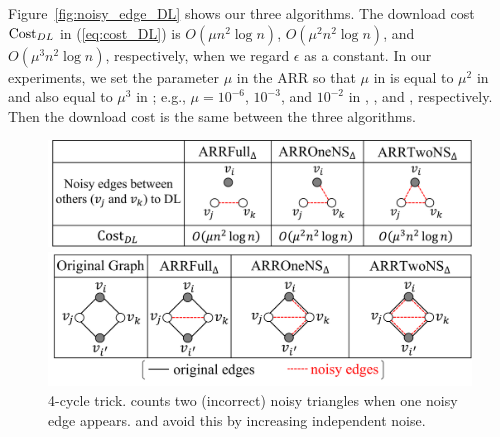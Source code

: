 Figure~\ref{fig:noisy_edge_DL} shows our three algorithms.
The download cost $\mathrm{Cost}_{DL}{}$ in (\ref{eq:cost_DL}) is
$O(\mu n^2 \log n)$, $O(\mu^2 n^2 \log n)$, and $O(\mu^3 n^2 \log n)$,
respectively, when we regard $\epsilon$ as a constant.
In our experiments, we set
the parameter $\mu$ in the ARR so that
$\mu$ in \AlgOne{} is equal to $\mu^2$ in \AlgTwo{} and also equal to $\mu^3$ in \AlgThree{};
e.g., $\mu=10^{-6}$, $10^{-3}$, and $10^{-2}$ in \AlgOne{}, \AlgTwo{}, and \AlgThree{}, respectively.
Then
the download cost
is the same between the three algorithms.

\begin{figure}[t]
  \centering
  \includegraphics[width=0.99\linewidth]{fig/three_algorithms.pdf}
  \vspace{-4mm}
  \caption{Noisy edges to download
  in our three algorithms.}
  \label{fig:noisy_edge_DL}
\vspace{4mm}
  \centering
  \includegraphics[width=0.95\linewidth]{fig/four_cycle.pdf}
  \vspace{-4mm}
  \caption{4-cycle trick.
  \AlgOne{} counts two (incorrect) noisy triangles when one noisy edge appears.
  \AlgTwo{} and \AlgThree{} avoid this by increasing independent noise.}
  \label{fig:four-cycle}
\end{figure}

